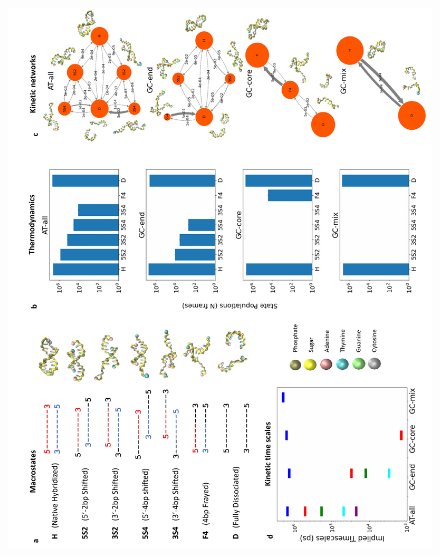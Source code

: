 \documentclass[journal=jpcbfk,manuscript=article]{achemso}
\begin{document}
\begin{figure}[ht!]
	\begin{center}
        \includegraphics[width=1.0\textwidth]{Fig2.pdf}
	\end{center}
\end{figure}
\end{document}
